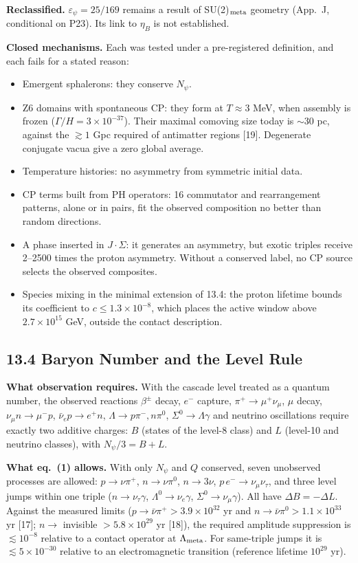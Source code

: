 \noindent \textbf{Reclassified. }$\varepsilon_\psi=25/169$ remains a result of SU(2)$_{\rm meta}$ geometry (App.~J, conditional on P23). Its link to $\eta_B$ is not established.

\noindent \textbf{Closed mechanisms. }Each was tested under a pre-registered definition, and each fails for a stated reason:
\begin{itemize}
\item Emergent sphalerons: they conserve $N_\psi$.
\item Z6 domains with spontaneous CP: they form at $T\approx3$ MeV, when assembly is frozen ($\Gamma/H=3\times10^{-37}$). Their maximal comoving size today is $\sim30$ pc, against the $\gtrsim1$ Gpc required of antimatter regions [19]. Degenerate conjugate vacua give a zero global average.
\item Temperature histories: no asymmetry from symmetric initial data.
\item CP terms built from PH operators: 16 commutator and rearrangement patterns, alone or in pairs, fit the observed composition no better than random directions.
\item A phase inserted in $J\!\cdot\!\Sigma$: it generates an asymmetry, but exotic triples receive 2--2500 times the proton asymmetry. Without a conserved label, no CP source selects the observed composites.
\item Species mixing in the minimal extension of 13.4: the proton lifetime bounds its coefficient to $c\le1.3\times10^{-8}$, which places the active window above $2.7\times10^{15}$ GeV, outside the contact description.
\end{itemize}

\subsection*{13.4  Baryon Number and the Level Rule}

\noindent \textbf{What observation requires. }With the cascade level treated as a quantum number, the observed reactions $\beta^\pm$ decay, $e^-$ capture, $\pi^+\to\mu^+\nu_\mu$, $\mu$ decay, $\nu_\mu n\to\mu^-p$, $\bar\nu_ep\to e^+n$, $\Lambda\to p\pi^-,n\pi^0$, $\Sigma^0\to\Lambda\gamma$ and neutrino oscillations require exactly two additive charges: $B$ (states of the level-8 class) and $L$ (level-10 and neutrino classes), with $N_\psi/3=B+L$.

\noindent \textbf{What eq.~(1) allows. }With only $N_\psi$ and $Q$ conserved, seven unobserved processes are allowed: $p\to\nu\pi^+$, $n\to\nu\pi^0$, $n\to3\nu$, $p\,e^-\to\nu_\mu\nu_\tau$, and three level jumps within one triple ($n\to\nu_\tau\gamma$, $\Lambda^0\to\nu_e\gamma$, $\Sigma^0\to\nu_\mu\gamma$). All have $\Delta B=-\Delta L$. Against the measured limits ($p\to\bar\nu\pi^+>3.9\times10^{32}$ yr and $n\to\bar\nu\pi^0>1.1\times10^{33}$ yr [17]; $n\to$ invisible $>5.8\times10^{29}$ yr [18]), the required amplitude suppression is $\lesssim10^{-8}$ relative to a contact operator at $\Lambda_{\rm meta}$. For same-triple jumps it is $\lesssim5\times10^{-30}$ relative to an electromagnetic transition (reference lifetime $10^{29}$ yr).

